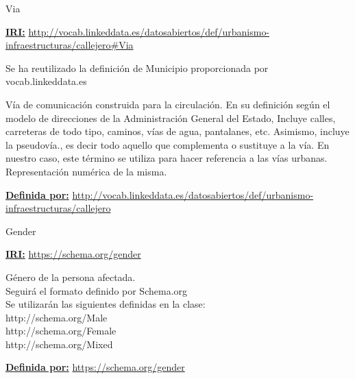\begin{mybox}{Via}
\begin{flushleft}
\underline{\textbf{IRI:}}
\url{http://vocab.linkeddata.es/datosabiertos/def/urbanismo-infraestructuras/callejero#Via}
\newline

Se ha reutilizado la definición de Municipio proporcionada por vocab.linkeddata.es \cite{datoabiertos_idVia}

Vía de comunicación construida para la circulación. En su definición según el modelo de direcciones de la Administración General del Estado, Incluye calles, carreteras de todo tipo, caminos, vías de agua, pantalanes, etc. Asimismo, incluye la pseudovía., es decir todo aquello que complementa o sustituye a la vía. En nuestro caso, este término se utiliza para hacer referencia a las vías urbanas.
Representación numérica de la misma.
\newline

\underline{\textbf{Definida por:}}\newline
\url{http://vocab.linkeddata.es/datosabiertos/def/urbanismo-infraestructuras/callejero}
\newline




\end{flushleft}
\end{mybox}





\begin{mybox}{Gender}
\begin{flushleft}
\underline{\textbf{IRI:}}
\url{https://schema.org/gender}
\newline

Género de la persona afectada.
\\Seguirá el formato definido por Schema.org
\\Se utilizarán las siguientes definidas en la clase:
\\http://schema.org/Male
\\http://schema.org/Female
\\http://schema.org/Mixed
\newline

\underline{\textbf{Definida por:}}\newline
\url{https://schema.org/gender}
\newline




\end{flushleft}
\end{mybox}



